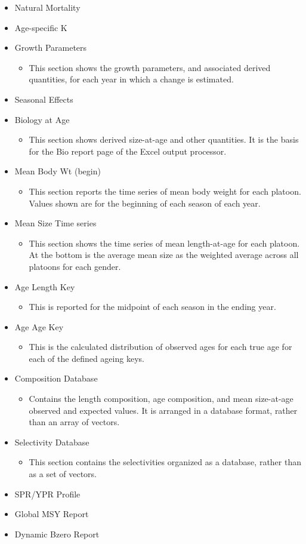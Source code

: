 \begin{itemize}
	\item Natural Mortality
	\item Age-specific K
	\item Growth Parameters
	\begin{itemize}
		\item This section shows the growth parameters, and associated derived quantities, for each year in which a change is estimated.
	\end{itemize}
	\item Seasonal Effects
	\item Biology at Age
	\begin{itemize}
		\item This section shows derived size-at-age and other quantities. It is the basis for the Bio report page of the Excel output processor.
	\end{itemize}
	\item Mean Body Wt (begin)
	\begin{itemize}
		\item This section reports the time series of mean body weight for each platoon. Values shown are for the beginning of each season of each year.
	\end{itemize}
	\item Mean Size Time series
	\begin{itemize}
		\item This section shows the time series of mean length-at-age for each platoon. At the bottom is the average mean size as the weighted average across all platoons for each gender.
	\end{itemize}
	\item Age Length Key
	\begin{itemize}
		\item This is reported for the midpoint of each season in the ending year.
	\end{itemize}
	\item Age Age Key
	\begin{itemize}
		\item This is the calculated distribution of observed ages for each true age for each of the defined ageing keys.
	\end{itemize}
	\item Composition Database
	\begin{itemize}
		\item Contains the length composition, age composition, and mean size-at-age observed and expected values.  It is arranged in a database format, rather than an array of vectors.
	\end{itemize}
	\item Selectivity Database
	\begin{itemize}
		\item This section contains the selectivities organized as a database, rather than as a set of vectors.
	\end{itemize}
	\item SPR/YPR Profile
	\item Global MSY Report
	\item Dynamic Bzero Report
\end{itemize}

\pagebreak
